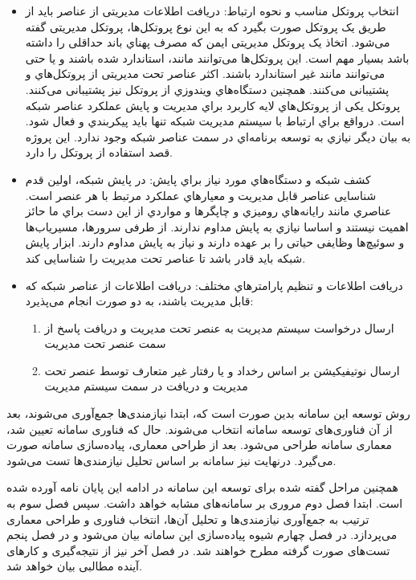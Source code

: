\begin{itemize}
    \item انتخاب پروتکل مناسب و نحوه ارتباط: دریافت اطلاعات مدیریتی از عناصر باید از طریق یک پروتکل صورت بگیرد که به این نوع پروتکل‌ها، پروتکل مدیریتی گفته می‌شود. اتخاذ یک پروتکل مدیریتی ایمن که مصرف پهناي باند حداقلی را داشته باشد بسیار مهم است. این پروتکل‌ها می‌توانند مانند، استاندارد شده باشند و یا حتی می‌توانند مانند  غیر استاندارد باشند. اکثر عناصر تحت مدیریتی از پروتکل‌هاي  و   پشتیبانی می‌کنند. همچنین دستگاه‌هاي ویندوزي از پروتکل  نیز پشتیبانی می‌کنند. پروتکل   یکی از پروتکل‌هاي لایه کاربرد براي مدیریت و پایش عملکرد عناصر شبکه است. درواقع براي ارتباط با سیستم مدیریت شبکه تنها باید پیکربندي و فعال شود. به بیان دیگر نیازي به توسعه برنامه‌اي در سمت عناصر شبکه وجود ندارد. این پروژه قصد استفاده از پروتکل  را دارد.
\newpage
    \item کشف شبکه و دستگاه‌هاي مورد نیاز براي پایش: در پایش شبکه، اولین قدم شناسایی عناصر قابل مدیریت و معیارهاي عملکرد مرتبط با هر عنصر است. عناصري مانند رایانه‌هاي رومیزي و چاپگرها و مواردي از این دست براي ما حائز اهمیت نیستند و اساسا نیازي به پایش مداوم ندارند. از طرفی سرورها، مسیریاب‌ها و سوئیچ‌ها وظایفی حیاتی را بر عهده دارند و نیاز به پایش مداوم دارند. ابزار پایش شبکه باید قادر باشد تا عناصر تحت مدیریت را شناسایی کند.
    \item دریافت اطلاعات و تنظیم پارامترهاي مختلف: دریافت اطلاعات از عناصر شبکه که قابل مدیریت باشند، به دو صورت انجام می‌پذیرد:
    \begin{enumerate}
        \item ارسال درخواست سیستم مدیریت به عنصر تحت مدیریت و دریافت پاسخ از سمت عنصر تحت مدیریت
        \item ارسال نوتیفیکیشن بر اساس رخداد و یا رفتار غیر متعارف توسط عنصر تحت مدیریت و دریافت در سمت سیستم مدیریت
    \end{enumerate}
\end{itemize}


روش توسعه این سامانه بدین صورت است که، ابتدا نیازمندی‌ها جمع‌آوری می‌شوند، بعد از آن فناوری‌های توسعه سامانه انتخاب می‌شوند. حال که فناوری سامانه تعیین شد، معماری سامانه طراحی می‌شود. بعد از طراحی معماری، پیاده‌سازی سامانه صورت می‌گیرد. درنهایت نیز سامانه بر اساس تحلیل نیازمندی‌ها تست می‌شود. 

همچنین مراحل گفته شده برای توسعه این سامانه در ادامه این پایان نامه آورده شده است. ابتدا فصل دوم مروری بر سامانه‌های مشابه خواهد داشت. سپس فصل سوم به ترتیب به جمع‌آوری نیازمندی‌ها و تحلیل آن‌ها، انتخاب فناوری و طراحی معماری می‌پردازد. در فصل چهارم شیوه پیاده‌سازی این سامانه بیان می‌شود و در فصل پنجم تست‌های صورت گرفته مطرح خواهند شد. در فصل آخر نیز از نتیجه‌گیری و کارهای آینده مطالبی بیان خواهد شد.

